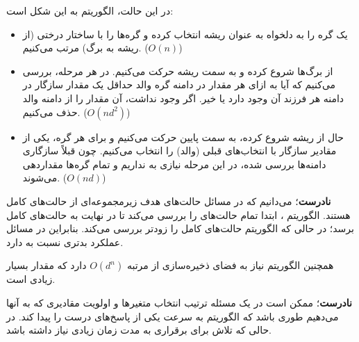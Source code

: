 \begin{ابجد}
در این حالت، الگوریتم به این شکل است:
\begin{itemize}
    \item یک گره را به دلخواه به عنوان ریشه انتخاب کرده و گره‌ها را با ساختار درختی (از ریشه به برگ) مرتب می‌کنیم. ($O(n)$)
    \item از برگ‌ها شروع کرده و به سمت ریشه حرکت می‌کنیم. در هر مرحله، بررسی می‌کنیم که آیا به ازای هر مقدار در دامنه گره والد حداقل یک مقدار سازگار در دامنه هر فرزند آن وجود دارد یا خیر. اگر وجود نداشت، آن مقدار را از دامنه والد حذف می‌کنیم. ($O(nd^2)$)
    \item حال از ریشه شروع کرده، به سمت پایین حرکت می‌کنیم و برای هر گره، یکی از مقادیر سازگار با انتخاب‌های قبلی (والد) را انتخاب می‌کنیم. چون قبلاً سازگاری دامنه‌ها بررسی شده، در این مرحله نیازی به  نداریم و تمام گره‌ها مقداردهی می‌شوند. ($O(nd)$)
\end{itemize}

\item \textbf{نادرست}؛ می‌دانیم که در مسائل  حالت‌های هدف زیرمجموعه‌ای از حالت‌های کامل هستند. الگوریتم ، ابتدا تمام حالت‌های  را بررسی می‌کند تا در نهایت به حالت‌های کامل برسد؛ در حالی که الگوریتم  حالت‌های کامل را زودتر بررسی می‌کند. بنابراین  در مسائل  عملکرد بدتری نسبت به  دارد.

همچنین الگوریتم  نیاز به فضای ذخیره‌سازی از مرتبه $O(d^n)$ دارد که مقدار بسیار زیادی است.

\item \textbf{نادرست}؛ ممکن است در یک مسئله ترتیب انتخاب متغیرها و اولویت مقادیری که به آنها می‌دهیم طوری باشد که الگوریتم  به سرعت یکی از پاسخ‌های درست را پیدا کند. در حالی که تلاش برای برقراری  به مدت زمان زیادی نیاز داشته باشد.

\end{ابجد}